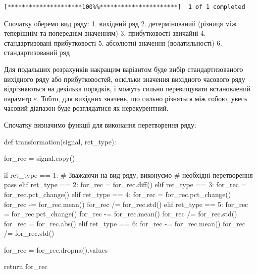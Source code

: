 \documentclass[
  letterpaper,
]{report}
\newenvironment{Shaded}{\begin{snugshade}}{\end{snugshade}}
\newcommand{\BuiltInTok}[1]{\textcolor[rgb]{0.00,0.23,0.31}{#1}}
\newcommand{\CommentTok}[1]{\textcolor[rgb]{0.37,0.37,0.37}{#1}}
\newcommand{\ControlFlowTok}[1]{\textcolor[rgb]{0.00,0.23,0.31}{#1}}
\newcommand{\DecValTok}[1]{\textcolor[rgb]{0.68,0.00,0.00}{#1}}
\newcommand{\KeywordTok}[1]{\textcolor[rgb]{0.00,0.23,0.31}{#1}}
\newcommand{\NormalTok}[1]{\textcolor[rgb]{0.00,0.23,0.31}{#1}}
\newcommand{\OperatorTok}[1]{\textcolor[rgb]{0.37,0.37,0.37}{#1}}
\begin{document}
\begin{verbatim}
[*********************100%%**********************]  1 of 1 completed
\end{verbatim}

Спочатку оберемо вид ряду: 1. вихідний ряд 2. детермінований (різниця
між теперішнім та попереднім значенням) 3. прибутковості звичайні 4.
стандартизовані прибутковості 5. абсолютні значення (волатильності) 6.
стандартизований ряд

Для подальших розрахунків накращим варіантом буде вибір
стандартизованого вихідного ряду або прибутковостей, оскільки значення
вихідного часового ряду відрізняються на декілька порядків, і можуть
сильно перевищувати встановлений параметр \(\varepsilon\). Тобто, для
вихідних значень, що сильно різняться між собою, увесь часовий діапазон
буде розглядатися як нерекурентний.

Спочатку визначимо функції для виконання перетворення ряду:

\begin{Shaded}
\begin{Highlighting}[]
\KeywordTok{def}\NormalTok{ transformation(signal, ret\_type):}

\NormalTok{    for\_rec }\OperatorTok{=}\NormalTok{ signal.copy()}

    \ControlFlowTok{if}\NormalTok{ ret\_type }\OperatorTok{==} \DecValTok{1}\NormalTok{:       }\CommentTok{\# Зважаючи на вид ряду, виконуємо}
                            \CommentTok{\# необхідні перетворення}
        \ControlFlowTok{pass}
    \ControlFlowTok{elif}\NormalTok{ ret\_type }\OperatorTok{==} \DecValTok{2}\NormalTok{:}
\NormalTok{        for\_rec }\OperatorTok{=}\NormalTok{ for\_rec.diff()}
    \ControlFlowTok{elif}\NormalTok{ ret\_type }\OperatorTok{==} \DecValTok{3}\NormalTok{:}
\NormalTok{        for\_rec }\OperatorTok{=}\NormalTok{ for\_rec.pct\_change()}
    \ControlFlowTok{elif}\NormalTok{ ret\_type }\OperatorTok{==} \DecValTok{4}\NormalTok{:}
\NormalTok{        for\_rec }\OperatorTok{=}\NormalTok{ for\_rec.pct\_change()}
\NormalTok{        for\_rec }\OperatorTok{{-}=}\NormalTok{ for\_rec.mean()}
\NormalTok{        for\_rec }\OperatorTok{/=}\NormalTok{ for\_rec.std()}
    \ControlFlowTok{elif}\NormalTok{ ret\_type }\OperatorTok{==} \DecValTok{5}\NormalTok{: }
\NormalTok{        for\_rec }\OperatorTok{=}\NormalTok{ for\_rec.pct\_change()}
\NormalTok{        for\_rec }\OperatorTok{{-}=}\NormalTok{ for\_rec.mean()}
\NormalTok{        for\_rec }\OperatorTok{/=}\NormalTok{ for\_rec.std()}
\NormalTok{        for\_rec }\OperatorTok{=}\NormalTok{ for\_rec.}\BuiltInTok{abs}\NormalTok{()}
    \ControlFlowTok{elif}\NormalTok{ ret\_type }\OperatorTok{==} \DecValTok{6}\NormalTok{:}
\NormalTok{        for\_rec }\OperatorTok{{-}=}\NormalTok{ for\_rec.mean()}
\NormalTok{        for\_rec }\OperatorTok{/=}\NormalTok{ for\_rec.std()}

\NormalTok{    for\_rec }\OperatorTok{=}\NormalTok{ for\_rec.dropna().values}

    \ControlFlowTok{return}\NormalTok{ for\_rec}
\end{Highlighting}
\end{Shaded}
\end{document}
